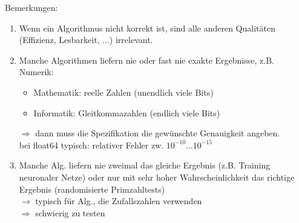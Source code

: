 \documentclass[11pt, fleqn]{scrreprt}
\begin{document}
Bemerkungen:
\begin{enumerate}
	\item Wenn ein Algorithmus nicht korrekt ist, sind alle anderen Qualitäten (Effizienz, Lesbarkeit, ...) irrelevant.
	\item Manche Algorithmen liefern nie oder fast nie exakte Ergebnisse, z.B. Numerik: 
	\begin{itemize}
		\item Mathematik: reelle Zahlen (unendlich viele Bits)
		\item Informatik: Gleitkommazahlen (endlich viele Bits)
	\end{itemize}
	$\Rightarrow$ dann muss die Spezifikation die gewünschte Genauigkeit angeben. \\
	bei float64 typisch: relativer Fehler zw. $10^{-10} \dots 10^{-15}$
	\item Manche Alg. liefern nie zweimal das gleiche Ergebnis (z.B. Training neuronaler Netze) oder nur mit sehr hoher Wahrscheinlichkeit das richtige Ergebnis (randomisierte Primzahltests)\\
	$\rightarrow$ typisch für Alg., die Zufallszahlen verwenden \\
	$\Rightarrow$ schwierig zu testen
\end{enumerate}
\end{document}
